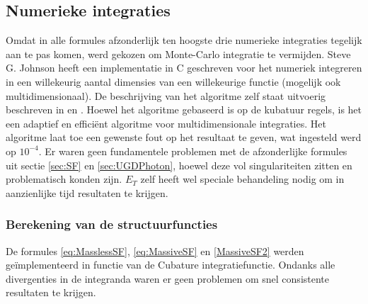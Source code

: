 \documentclass[a4paper,11pt]{article}
\numberwithin{equation}{section} %
\begin{document}
  \subsection{Numerieke integraties}
Omdat in alle formules afzonderlijk ten hoogste drie numerieke integraties tegelijk aan te pas komen, werd gekozen om Monte-Carlo integratie te vermijden.
Steve G. Johnson heeft een implementatie in C geschreven voor het numeriek integreren in een willekeurig aantal dimensies van een willekeurige functie (mogelijk ook multidimensionaal).
De beschrijving van het algoritme zelf staat uitvoerig beschreven in \cite{Genz} en \cite{Berntsen}.
Hoewel het algoritme gebaseerd is op de kubatuur regels, is het een adaptief en efficiënt algoritme voor multidimensionale integraties.
Het algoritme laat toe een gewenste fout op het resultaat te geven, wat ingesteld werd op $10^{-4}$.
Er waren geen fundamentele problemen met de afzonderlijke formules uit sectie \ref{sec:SF} en \ref{sec:UGDPhoton}, hoewel deze vol singulariteiten zitten en problematisch konden zijn.
$E_T$ zelf heeft wel speciale behandeling nodig om in aanzienlijke tijd resultaten te krijgen.

  \subsubsection{Berekening van de structuurfuncties}
De formules \eqref{eq:MasslessSF}, \eqref{eq:MassiveSF} en \eqref{MassiveSF2} werden geïmplementeerd in functie van de Cubature integratiefunctie.
Ondanks alle divergenties in de integranda waren er geen problemen om snel consistente resultaten te krijgen.
\end{document}
